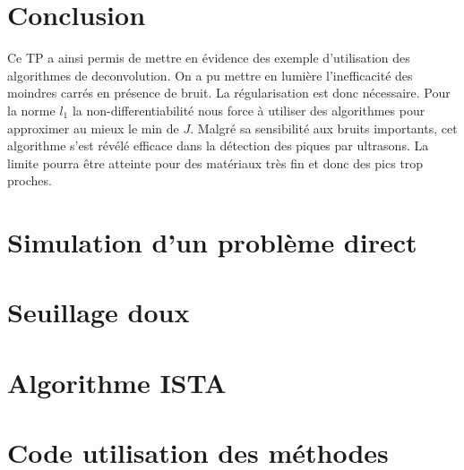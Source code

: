 \documentclass[12pt,a4paper,titlepage]{article}
\begin{document}
\section*{Conclusion}
Ce TP a ainsi permis de mettre en évidence des exemple d'utilisation des algorithmes de deconvolution. On a pu mettre en lumière l'inefficacité des moindres carrés en présence de bruit. La régularisation est donc nécessaire. Pour la norme $l_1$ la non-differentiabilité nous force à utiliser des algorithmes pour approximer au mieux le min de $J$. Malgré sa sensibilité aux bruits importants, cet algorithme s'est révélé efficace dans la détection des piques par ultrasons. La limite pourra être atteinte pour des matériaux très fin et donc des pics trop proches.
\pagebreak

\begin{appendices}
  \section{Simulation d'un problème direct}
    
  \section{Seuillage doux}
    
  \section{Algorithme ISTA}
    
  \section{Code utilisation des méthodes }
    
\end{appendices}
\end{document}

